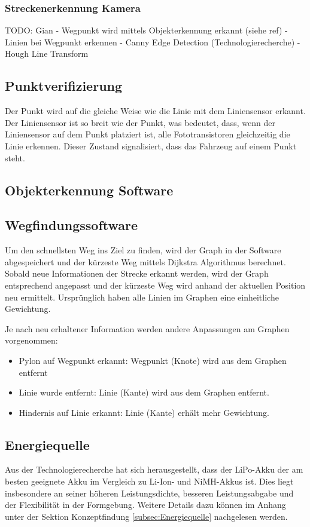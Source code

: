 \documentclass[../main.tex]{subfiles}
\begin{document}
\subsubsection{Streckenerkennung Kamera}

TODO: Gian
- Wegpunkt wird mittels Objekterkennung erkannt (siehe ref)
- Linien bei Wegpunkt erkennen
  - Canny Edge Detection (Technologierecherche)
  - Hough Line Transform



\subsection{Punktverifizierung}
Der Punkt wird auf die gleiche Weise wie die Linie mit dem Liniensensor erkannt. Der Liniensensor ist so breit wie der Punkt, was bedeutet, dass, wenn der Liniensensor auf dem Punkt platziert ist, alle Fototransistoren gleichzeitig die Linie erkennen. Dieser Zustand signalisiert, dass das Fahrzeug auf einem Punkt steht.


\subsection{Objekterkennung Software}




\subsection{Wegfindungssoftware}

Um den schnellsten Weg ins Ziel zu finden, wird der Graph in der Software abgespeichert
und der kürzeste Weg mittels Dijkstra Algorithmus berechnet. Sobald neue Informationen der Strecke erkannt werden, wird der Graph entsprechend angepasst und der kürzeste Weg wird anhand der aktuellen Position neu ermittelt.
Ursprünglich haben alle Linien im Graphen eine einheitliche Gewichtung. 

Je nach neu erhaltener Information werden andere Anpassungen am Graphen vorgenommen:
\begin{itemize}
    \item Pylon auf Wegpunkt erkannt: Wegpunkt (Knote) wird aus dem Graphen entfernt
    \item Linie wurde entfernt: Linie (Kante) wird aus dem Graphen entfernt.
    \item Hindernis auf Linie erkannt: Linie (Kante) erhält mehr Gewichtung.
\end{itemize}

\subsection{Energiequelle}
Aus der Technologierecherche hat sich herausgestellt, dass der LiPo-Akku der am besten geeignete Akku im Vergleich zu Li-Ion- und NiMH-Akkus ist. Dies liegt insbesondere an seiner höheren Leistungsdichte, besseren Leistungsabgabe und der Flexibilität in der Formgebung. Weitere Details dazu können im Anhang unter der Sektion Konzeptfindung \ref{subsec:Energiequelle} nachgelesen werden.
\end{document}
